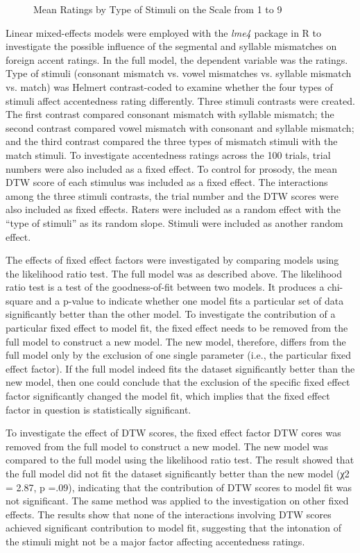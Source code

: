 \begin{figure}[!h]
  \figSpace
\centering

\caption{Mean Ratings by Type of Stimuli on the Scale from 1 to 9}
\label{fig:bar1}
\figSpace
\end{figure}

Linear mixed-effects models were employed with the \textit{lme4} package in R \citep{Bates_2014} to investigate the possible influence of the segmental and syllable mismatches on foreign accent ratings. In the full model, the dependent variable was the ratings. Type of stimuli (consonant mismatch vs. vowel mismatches vs. syllable mismatch vs. match) was Helmert contrast-coded to examine whether the four types of stimuli affect accentedness rating differently. Three stimuli contrasts were created. The first contrast compared consonant mismatch with syllable mismatch; the second contrast compared vowel mismatch with consonant and syllable mismatch; and the third contrast compared the three types of mismatch stimuli with the match stimuli. To investigate accentedness ratings across the 100 trials, trial numbers were also included as a fixed effect. To control for prosody, the mean DTW score of each stimulus was included as a fixed effect. The interactions among the three stimuli contrasts, the trial number and the DTW scores were also included as fixed effects. Raters were included as a random effect with the “type of stimuli” as its random slope. Stimuli were included as another random effect.

The effects of fixed effect factors were investigated by comparing models using the likelihood ratio test. The full model was as described above. The likelihood ratio test is a test of the goodness-of-fit between two models. It produces a chi-square and a p-value to indicate whether one model fits a particular set of data significantly better than the other model. To investigate the contribution of a particular fixed effect to model fit, the fixed effect needs to be removed from the full model to construct a new model. The new model, therefore, differs from the full model only by the exclusion of one single parameter (i.e., the particular fixed effect factor). If the full model indeed fits the dataset significantly better than the new model, then one could conclude that the exclusion of the specific fixed effect factor significantly changed the model fit, which implies that the fixed effect factor in question is statistically significant. 

To investigate the effect of DTW scores, the fixed effect factor DTW cores was removed from the full model to construct a new model.  The new model was compared to the full model using the likelihood ratio test. The result showed that the full model did not fit the dataset significantly better than the new model (χ2 = 2.87, p =.09), indicating that the contribution of DTW scores to model fit was not significant. The same method was applied to the investigation on other fixed effects. The results show that none of the interactions involving DTW scores achieved significant contribution to model fit, suggesting that the intonation of the stimuli might not be a major factor affecting accentedness ratings. 


